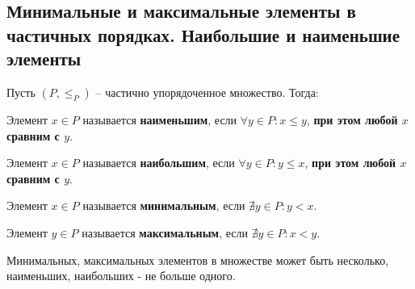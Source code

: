 \subsection{Минимальные и максимальные элементы в частичных порядках. Наибольшие и наименьшие элементы}

Пусть $(P, \le_P)$ -- частично упорядоченное множество. Тогда:

Элемент $x \in P$ называется \textbf{наименьшим}, если $\forall y \in P : x \le y$, \textbf{ при этом любой $x$ сравним с $y$}.

Элемент $x \in P$ называется \textbf{наибольшим}, если $\forall y \in P : y \le x$, \textbf{при этом любой $x$ сравним с $y$}.

Элемент $x \in P$ называется \textbf{минимальным}, если $\nexists y \in P: y < x$.

Элемент $y \in P$ называется \textbf{максимальным}, если $\nexists y \in P: x < y$.

Минимальных, максимальных элементов в множестве может быть несколько, наименьших, наибольших - не больше одного.
